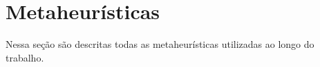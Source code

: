 \section{Metaheurísticas}
\label{section:metaheuristics}

Nessa seção são descritas todas as metaheurísticas utilizadas ao longo do trabalho.
